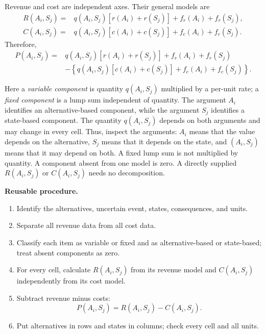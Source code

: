 Revenue and cost are independent axes. Their general models are
\[
\begin{aligned}
	R(A_i,S_j)
	={}&
	q(A_i,S_j)
	\left[
	r(A_i)+r(S_j)
	\right]
	+
	f_r(A_i)
	+
	f_r(S_j),
	\\
	C(A_i,S_j)
	={}&
	q(A_i,S_j)
	\left[
	c(A_i)+c(S_j)
	\right]
	+
	f_c(A_i)
	+
	f_c(S_j).
\end{aligned}
\]
Therefore,
\[
\begin{aligned}
	P(A_i,S_j)
	={}&
	q(A_i,S_j)
	\left[
	r(A_i)+r(S_j)
	\right]
	+
	f_r(A_i)
	+
	f_r(S_j)
	\\
	&-
	\left\{
	q(A_i,S_j)
	\left[
	c(A_i)+c(S_j)
	\right]
	+
	f_c(A_i)
	+
	f_c(S_j)
	\right\}.
\end{aligned}
\]

Here a \emph{variable component} is quantity \(q(A_i,S_j)\) multiplied by a
per-unit rate; a \emph{fixed component} is a lump sum independent of quantity.
The argument \(A_i\) identifies an alternative-based component, while the
argument \(S_j\) identifies a state-based component. The quantity
\(q(A_i,S_j)\) depends on both arguments and may
change in every cell. Thus, inspect the arguments: \(A_i\) means that the value
depends on the alternative, \(S_j\) means that it depends on the state, and
\((A_i,S_j)\) means that it may depend on both. A fixed lump sum is not
multiplied by quantity. A component absent from one model is zero. A directly
supplied \(R(A_i,S_j)\) or \(C(A_i,S_j)\) needs no decomposition.

\textbf{Reusable procedure.}
\begin{enumerate}[label=\arabic*.]
	\item Identify the alternatives, uncertain event, states, consequences, and
	units.
	
	\item Separate all revenue data from all cost data.
	
	\item Classify each item as variable or fixed and as alternative-based or
	state-based; treat absent components as zero.
	
	\item For every cell, calculate \(R(A_i,S_j)\) from its revenue model and
	\(C(A_i,S_j)\) independently from its cost model.
	
	\item Subtract revenue minus costs:
	\[
	P(A_i,S_j)=R(A_i,S_j)-C(A_i,S_j).
	\]
	
	\item Put alternatives in rows and states in columns; check every cell and
	all units.
\end{enumerate}

